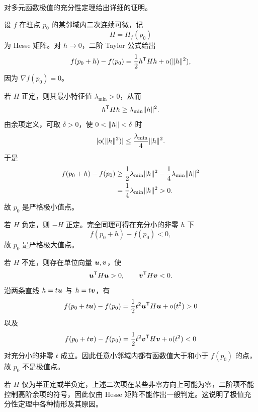 \begin{xreferenceproblem}[11]
对多元函数极值的充分性定理给出详细的证明。
\end{xreferenceproblem}
\begin{xsolution}
设 $f$ 在驻点 $p_0$ 的某邻域内二次连续可微，记
\[
  H=H_f(p_0)
\]
为 Hesse 矩阵。对 $h\to0$，二阶 Taylor 公式给出
\[
  f(p_0+h)-f(p_0)
  =\frac12h^{\mathsf T}Hh+\mathrm{o}(\lVert h\rVert^2),
\]
因为 $\nabla f(p_0)=0$。

若 $H$ 正定，则其最小特征值 $\lambda_{\min}>0$，从而
\[
  h^{\mathsf T}Hh\ge\lambda_{\min}\lVert h\rVert^2.
\]
由余项定义，可取 $\delta>0$，使 $0<\lVert h\rVert<\delta$ 时
\[
  \lvert\mathrm{o}(\lVert h\rVert^2)\rvert
  \le\frac{\lambda_{\min}}4\lVert h\rVert^2.
\]
于是
\[
\begin{aligned}
  f(p_0+h)-f(p_0)
  &\ge\frac12\lambda_{\min}\lVert h\rVert^2
  -\frac14\lambda_{\min}\lVert h\rVert^2\\
  &=\frac14\lambda_{\min}\lVert h\rVert^2>0.
\end{aligned}
\]
故 $p_0$ 是严格极小值点。

若 $H$ 负定，则 $-H$ 正定。完全同理可得在充分小的非零 $h$ 下
\[
  f(p_0+h)-f(p_0)<0,
\]
故 $p_0$ 是严格极大值点。

若 $H$ 不定，则存在单位向量 $\bm{u},\bm{v}$，使
\[
  \bm{u}^{\mathsf T}H\bm{u}>0,
  \qquad
  \bm{v}^{\mathsf T}H\bm{v}<0.
\]
沿两条直线 $h=t\bm{u}$ 与 $h=t\bm{v}$，有
\[
  f(p_0+t\bm{u})-f(p_0)
  =\frac12t^2\bm{u}^{\mathsf T}H\bm{u}+\mathrm{o}(t^2)>0
\]
以及
\[
  f(p_0+t\bm{v})-f(p_0)
  =\frac12t^2\bm{v}^{\mathsf T}H\bm{v}+\mathrm{o}(t^2)<0
\]
对充分小的非零 $t$ 成立。因此任意小邻域内都有函数值大于和小于 $f(p_0)$ 的点，故 $p_0$ 不是极值点。

若 $H$ 仅为半正定或半负定，上述二次项在某些非零方向上可能为零，二阶项不能控制高阶余项的符号，因此仅由 Hesse 矩阵不能作出一般判定。这说明了极值充分性定理中各种情形及其原因。
\end{xsolution}



